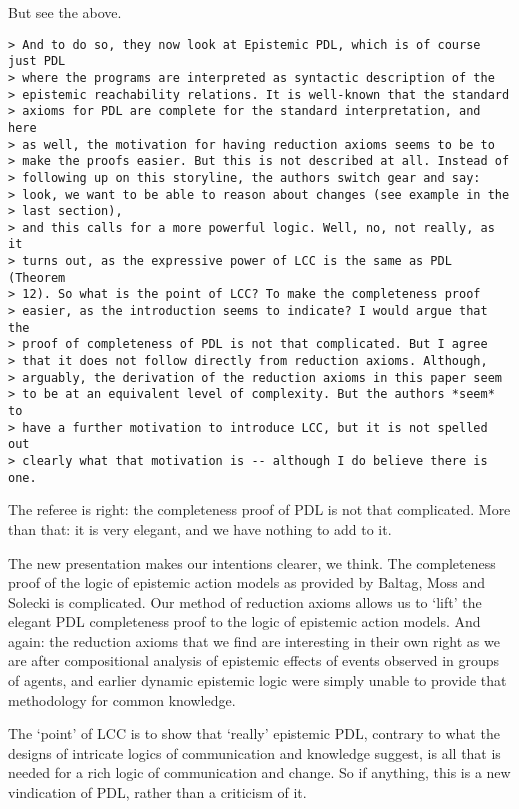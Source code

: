 \documentclass{article}
\begin{document}
But see the above.

\begin{verbatim} 
> And to do so, they now look at Epistemic PDL, which is of course just PDL
> where the programs are interpreted as syntactic description of the
> epistemic reachability relations. It is well-known that the standard
> axioms for PDL are complete for the standard interpretation, and here
> as well, the motivation for having reduction axioms seems to be to
> make the proofs easier. But this is not described at all. Instead of
> following up on this storyline, the authors switch gear and say:
> look, we want to be able to reason about changes (see example in the
> last section),
> and this calls for a more powerful logic. Well, no, not really, as it
> turns out, as the expressive power of LCC is the same as PDL (Theorem
> 12). So what is the point of LCC? To make the completeness proof
> easier, as the introduction seems to indicate? I would argue that the
> proof of completeness of PDL is not that complicated. But I agree
> that it does not follow directly from reduction axioms. Although,
> arguably, the derivation of the reduction axioms in this paper seem
> to be at an equivalent level of complexity. But the authors *seem* to
> have a further motivation to introduce LCC, but it is not spelled out
> clearly what that motivation is -- although I do believe there is one.
\end{verbatim} 

The referee is right: the completeness proof of PDL is not that
complicated. More than that: it is very elegant, and we have nothing
to add to it.

The new presentation makes our intentions clearer, we think.
The completeness proof of the logic of epistemic action models as
provided by Baltag, Moss and Solecki is complicated. Our method of
reduction axioms allows us to `lift' the elegant PDL completeness
proof to the logic of epistemic action models. And again: the
reduction axioms that we find are interesting in their own right
as we are after compositional analysis of epistemic effects of events
observed in groups of agents, and earlier dynamic epistemic logic were
simply unable to provide that methodology for common knowledge.

The `point' of LCC is to show that `really' epistemic PDL, contrary to
what the designs of intricate logics of communication and knowledge
suggest, is all that is needed for a rich logic of communication and
change. So if anything, this is a new vindication of PDL, rather than
a criticism of it.
\end{document}

